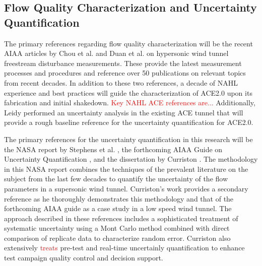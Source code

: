 \subsection{Flow Quality Characterization and Uncertainty Quantification}
The primary references regarding flow quality characterization will be the recent AIAA articles by Chou et al. \cite{chou} and Duan et al. \cite{duan} on hypersonic wind tunnel freestream disturbance measurements. These provide the latest measurement processes and procedures and reference over 50 publications on relevant topics from recent decades. In addition to these two references, a decade of NAHL experience and best practices will guide the characterization of ACE2.0 upon its fabrication and initial shakedown. \textcolor{red}{Key NAHL ACE references are...} Additionally, Leidy \cite{leidy-dis} performed an uncertainty analysis in the existing ACE tunnel that will provide a rough baseline reference for the uncertainty quantification for ACE2.0.

The primary references for the uncertainty quantification in this research will be the NASA report by Stephens et al. \cite{stephens-hubbard}, the forthcoming AIAA Guide on Uncertainty Quantification \cite{uq-aiaa}, and the dissertation by Curriston \cite{curriston-dis}. The methodology in this NASA report combines the techniques of the prevalent literature on the subject from the last few decades to quantify the uncertainty of the flow parameters in a supersonic wind tunnel. Curriston's work provides a secondary reference as he thoroughly demonstrates this methodology and that of the forthcoming AIAA guide as a case study in a low speed wind tunnel. The approach described in these references includes a sophisticated treatment of systematic uncertainty using a Mont Carlo method combined with direct comparison of replicate data to characterize random error. Curriston \cite{curriston-dis} also extensively \textcolor{red}{treats} pre-test and real-time uncertainly quantification to enhance test campaign quality control and decision support.

